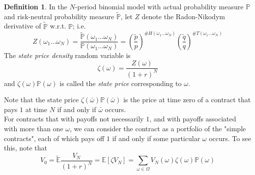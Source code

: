 \documentclass[a4paper]{article}
\theoremstyle{definition}
\newtheorem{defn}[thm]{Definition}
\begin{document}
\begin{defn}
In the $N$-period binomial model with actual probability measure $\mathbb{P}$ and risk-neutral probability measure $\tilde{\mathbb{P}}$, let $Z$ denote the Radon-Nikodym derivative of $\tilde{\mathbb{P}}$ w.r.t. $\mathbb{P}$; i.e. 
$$Z(\omega_1...\omega_N) = \frac{\tilde{\mathbb{P}}(\omega_1...\omega_N)}{\mathbb{P}(\omega_1...\omega_N)}=\left(\frac{\tilde{p}}{p}\right)^{\#H(\omega_1...\omega_N)}\left(\frac{\tilde{q}}{q}\right)^{\#T(\omega_1...\omega_N)}$$
The \textit{state price density} random variable is 
$$\zeta(\omega) = \frac{Z(\omega)}{(1+r)^N}$$
and $\zeta(\omega)\mathbb{P}(\omega)$ is called the \textit{state price} corresponding to $\omega$. 
\end{defn}
Note that the state price $\zeta(\bar{\omega})\mathbb{P}(\bar{\omega})$ is the price at time zero of a contract that pays $1$ at time $N$ if and only if $\bar{\omega}$ occurs. \\
For contracts that with payoffs not necessarily $1$, and with payoffs associated with more than one $\omega$, we can consider the contract as a portfolio of the "simple contracts", each of which pays off $1$ if and only if some particular $\omega$ occurs. To see this, note that 
$$V_0 = \tilde{\mathbb{E}}\frac{V_N}{(1+r)^N} = \mathbb{E}[\zeta V_N] = \sum_{\omega\in\Omega}V_N(\omega)\zeta(\omega)\mathbb{P}(\omega)$$
\end{document}
